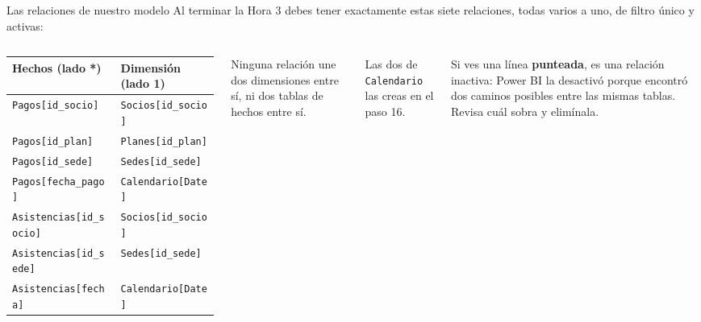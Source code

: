\documentclass[aspectratio=169,11pt]{beamer}
\begin{document}
\begin{frame}[t]{Las relaciones de nuestro modelo}
  \small
  Al terminar la Hora 3 debes tener exactamente estas siete relaciones,
  todas varios a uno, de filtro único y activas:
  \vspace{0.15cm}

  \footnotesize
  \renewcommand{\arraystretch}{1.1}
  \begin{columns}[T,onlytextwidth]
    \begin{tabular}{@{}ll@{}}
      \toprule
      \textbf{Hechos (lado *)} & \textbf{Dimensión (lado 1)} \\
      \midrule
      \texttt{Pagos[id\_socio]} & \texttt{Socios[id\_socio]} \\
      \texttt{Pagos[id\_plan]} & \texttt{Planes[id\_plan]} \\
      \texttt{Pagos[id\_sede]} & \texttt{Sedes[id\_sede]} \\
      \texttt{Pagos[fecha\_pago]} & \texttt{Calendario[Date]} \\
      \texttt{Asistencias[id\_socio]} & \texttt{Socios[id\_socio]} \\
      \texttt{Asistencias[id\_sede]} & \texttt{Sedes[id\_sede]} \\
      \texttt{Asistencias[fecha]} & \texttt{Calendario[Date]} \\
      \bottomrule
    \end{tabular}
    \small
    Ninguna relación une dos dimensiones entre sí, ni dos tablas de
    hechos entre sí.
    \vspace{0.15cm}

    \small Las dos de \texttt{Calendario} las creas en el paso 16.
    \vspace{0.15cm}

    \small Si ves una línea \textbf{punteada}, es una relación inactiva:
    Power BI la desactivó porque encontró dos caminos posibles entre las
    mismas tablas. Revisa cuál sobra y elimínala.
  \end{columns}
\end{frame}
\end{document}
